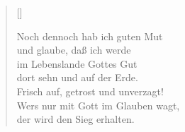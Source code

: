 \begin{center}
\settowidth{\versewidth}{Der, vor dem die Welt erschrickt,}
\begin{verse}[\versewidth]

 Noch dennoch hab ich guten Mut\\
und glaube, daß ich werde\\
im Lebenslande Gottes Gut\\
dort sehn und auf der Erde.\\
Frisch auf, getrost und unverzagt!\\
Wers nur mit Gott im Glauben wagt,\\
der wird den Sieg erhalten.

\end{verse}
\end{center}


